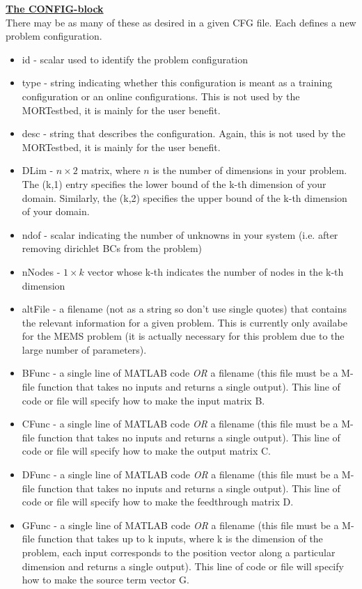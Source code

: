 \documentclass[notitlepage]{report}
\begin{document}
\vspace{2mm}
\noindent \underline{\textbf{The CONFIG-block }} \\
There may be as many of these as desired in a given CFG file.  Each defines a new problem configuration.
\begin{itemize}
    \item id - scalar used to identify the problem configuration
    \item type - string indicating whether this configuration is meant as a training configuration or an online configurations.  This is not used by the MORTestbed, it is mainly for the user benefit.
    \item desc - string that describes the configuration.  Again,  this is not used by the MORTestbed, it is mainly for the user benefit.
    \item DLim - $n \times 2$ matrix, where $n$ is the number of dimensions in your problem.  The (k,1) entry specifies the lower bound of the k-th dimension of your domain.  Similarly, the (k,2) specifies the upper bound of the k-th dimension of your domain.
   \item  ndof - scalar indicating the number of unknowns in your system (i.e. after removing dirichlet BCs from the problem)
    \item nNodes  - $1 \times k$ vector whose k-th indicates the number of nodes in the k-th dimension
    \item altFile - a filename (not as a string so don't use single quotes) that contains the relevant information for a given problem.  This is currently only availabe for the MEMS problem (it is actually necessary for this problem due to the large number of parameters).
    \item BFunc - a single line of MATLAB code \emph{OR} a filename (this file must be a M-file function that takes no inputs and returns a single output).  This line of code or file will specify how to make the input matrix B.
    \item CFunc - a single line of MATLAB code \emph{OR} a filename (this file must be a M-file function that takes no inputs  and returns a single output).  This line of code or file will specify how to make the output matrix C.
    \item DFunc - a single line of MATLAB code \emph{OR} a filename (this file must be a M-file function that takes no inputs  and returns a single output).  This line of code or file will specify how to make the feedthrough matrix D.
    \item GFunc - a single line of MATLAB code \emph{OR} a filename (this file must be a M-file function that takes up to k inputs, where k is the dimension of the problem, each input corresponds to the position vector along a particular dimension  and returns a single output).  This line of code or file will specify how to make the source term vector G.

\end{itemize}
\end{document}
